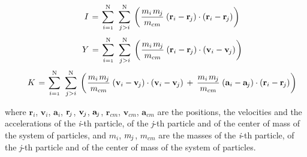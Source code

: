 \documentclass[10pt,fleqn]{article}
\newcommand{\mM}{m}
\newcommand{\mI}{I}
\newcommand{\mY}{Y}
\newcommand{\mK}{K}
\newcommand{\ri}{_i}
\newcommand{\rcm}{_{cm}}
\newcommand{\vR}{\mathbf{r}}
\newcommand{\vV}{\mathbf{v}}
\newcommand{\vA}{\mathbf{a}}
\newcommand{\rj}{_{\hspace{-0.081em}j}}
\begin{document}
\begin{eqnarray*}
\hspace{+1.50em} \mI \hspace{+0.12em} = \hspace{+0.12em} \sum_{i={\scriptscriptstyle 1}}^{\mathrm N} \hspace{+0.36em} \sum_{j>i}^{\mathrm N} \hspace{+0.24em} \left( \hspace{+0.06em} \frac{\mM\ri \hspace{+0.12em} \mM\rj}{\mM\rcm} \hspace{+0.24em} (\vR\ri - \vR\rj) \cdot (\vR\ri - \vR\rj) \hspace{+0.06em} \right)
\end{eqnarray*}
\begin{eqnarray*}
\hspace{+1.50em} \mY \hspace{+0.12em} = \hspace{+0.12em} \sum_{i={\scriptscriptstyle 1}}^{\mathrm N} \hspace{+0.36em} \sum_{j>i}^{\mathrm N} \hspace{+0.24em} \left( \hspace{+0.06em} \frac{\mM\ri \hspace{+0.12em} \mM\rj}{\mM\rcm} \hspace{+0.24em} (\vR\ri - \vR\rj) \cdot (\vV\ri - \vV\rj) \hspace{+0.06em} \right)
\end{eqnarray*}
\begin{eqnarray*}
\hspace{+1.50em} \mK \hspace{+0.12em} = \hspace{+0.12em} \sum_{i={\scriptscriptstyle 1}}^{\mathrm N} \hspace{+0.36em} \sum_{j>i}^{\mathrm N} \hspace{+0.24em} \left( \hspace{+0.06em} \frac{\mM\ri \hspace{+0.12em} \mM\rj}{\mM\rcm} \hspace{+0.24em} (\vV\ri - \vV\rj) \cdot (\vV\ri - \vV\rj) \hspace{+0.18em} + \hspace{+0.18em} \frac{\mM\ri \hspace{+0.12em} \mM\rj}{\mM\rcm} \hspace{+0.24em} (\vA\ri - \vA\rj) \cdot (\vR\ri - \vR\rj) \hspace{+0.06em} \right)
\end{eqnarray*}
\smallskip
\par \noindent where $\vR\ri$, $\vV\ri$, $\vA\ri$, $\vR\rj$, $\vV\rj$, $\vA\rj$, $\vR\rcm$, $\vV\rcm$, $\vA\rcm$ are the positions, the velocities and the accelerations of the \textit{i}-th particle, of the \textit{j}-th particle and of the center of mass of the system of particles, and $\mM\ri$, $\mM\rj$, $\mM\rcm$ are the masses of the \textit{i}-th particle, of the \textit{j}-th particle and of the center of mass of the system of particles.
\end{document}
